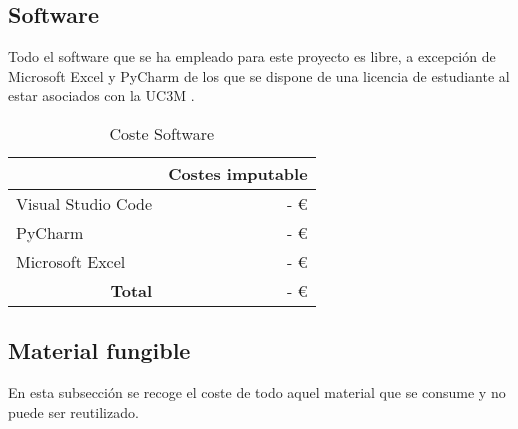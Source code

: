 \subsection{Software}
Todo el software que se ha empleado para este proyecto es libre, a excepción de Microsoft Excel y PyCharm de los que se dispone de una licencia de estudiante al estar asociados con la UC3M \cite{microsoft_microsoft_nodate}.

\begin{table}[H]
	\centering
	\caption{Coste Software}
	\label{tab:coste_software}
	\begin{tabular}{l|r|}
		\hline
		\rowcolor[HTML]{BFBFBF}
		\multicolumn{1}{|c|}{\cellcolor[HTML]{BFBFBF}\textbf{Descripción}} & \multicolumn{1}{c|}{\cellcolor[HTML]{BFBFBF}\textbf{Costes imputable}} \\ \hline
		\multicolumn{1}{|l|}{Visual Studio Code}                           & -   €                                                                  \\ \hline
		\multicolumn{1}{|l|}{PyCharm}                                      & -   €                                                                  \\ \hline
		\multicolumn{1}{|l|}{Microsoft Excel}                              & -   €                                                                  \\ \hline
		\multicolumn{1}{r|}{\textbf{Total}}                                & -   €                                                                  \\ \cline{2-2}
	\end{tabular}
\end{table}

\subsection{Material fungible}
En esta subsección se recoge el coste de todo aquel material que se consume y no puede ser reutilizado.

